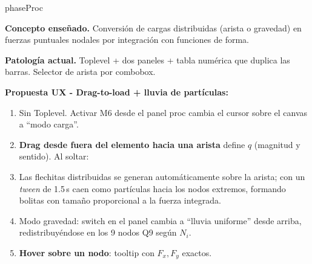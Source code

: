\documentclass[11pt,a4paper]{article}
\begin{document}
\begin{moduleBox}{phaseProc}

\textbf{Concepto enseñado.} Conversión de cargas distribuidas (arista o
gravedad) en fuerzas puntuales nodales por integración con funciones
de forma.

\textbf{Patología actual.} Toplevel + dos paneles + tabla numérica que
duplica las barras. Selector de arista por combobox.

\textbf{Propuesta UX - Drag-to-load + lluvia de partículas:}
\begin{enumerate}[leftmargin=1.2em, itemsep=2pt]
  \item Sin Toplevel. Activar M6 desde el panel proc cambia el cursor
        sobre el canvas a ``modo carga''.
  \item \textbf{Drag desde fuera del elemento hacia una arista} define
        $q$ (magnitud y sentido). Al soltar:
  \item Las flechitas distribuidas se generan automáticamente sobre
        la arista; con un \emph{tween} de 1.5\,s caen como partículas
        hacia los nodos extremos, formando bolitas con tamaño
        proporcional a la fuerza integrada.
  \item Modo gravedad: switch en el panel cambia a ``lluvia uniforme''
        desde arriba, redistribuyéndose en los 9 nodos Q9 según $N_i$.
  \item \textbf{Hover sobre un nodo}: tooltip con $F_x, F_y$ exactos.
\end{enumerate}

\begin{center}
\end{center}
\end{moduleBox}
\end{document}
